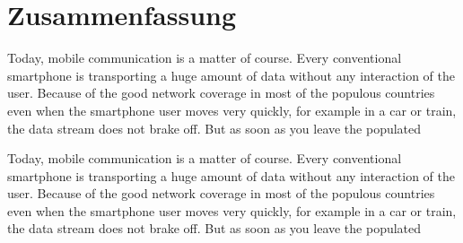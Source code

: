 
\chapter{Zusammenfassung}

Today, mobile communication is a matter of course. Every conventional 
smartphone is transporting a huge amount of data without any interaction of the
user. Because of the good network coverage in most of the populous countries
even when the smartphone user moves very quickly, for example in a car or train,
the data stream does not brake off. But as soon as you leave the populated

Today, mobile communication is a matter of course. Every conventional
smartphone is transporting a huge amount of data without any interaction of the
user. Because of the good network coverage in most of the populous countries
even when the smartphone user moves very quickly, for example in a car or train,
the data stream does not brake off. But as soon as you leave the populated

\clearpage
